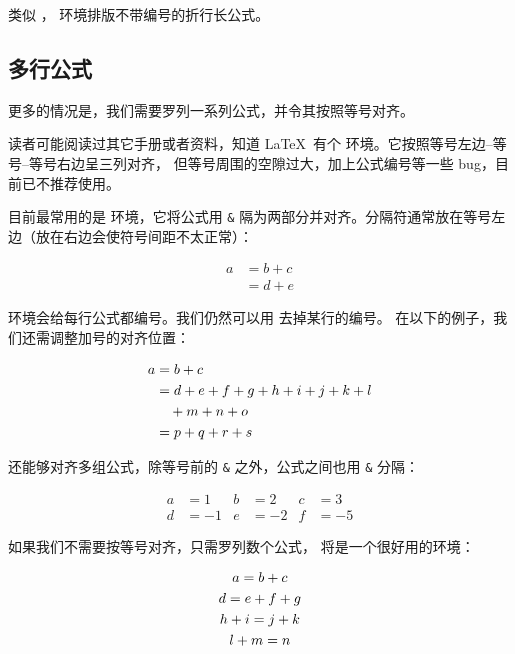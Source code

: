 类似 ， 环境排版不带编号的折行长公式。

\subsection{多行公式}

更多的情况是，我们需要罗列一系列公式，并令其按照等号对齐。

读者可能阅读过其它手册或者资料，知道 \LaTeX\ 有个  环境。它按照等号左边--等号--等号右边呈三列对齐，
但等号周围的空隙过大，加上公式编号等一些 bug，目前已不推荐使用。

目前最常用的是  环境，它将公式用 \texttt\& 隔为两部分并对齐。分隔符通常放在等号左边（放在右边会使符号间距不太正常）：
\begin{example}
\begin{align}
a & = b + c \\
& = d + e
\end{align}
\end{example}

 环境会给每行公式都编号。我们仍然可以用  去掉某行的编号。
在以下的例子，我们还需调整加号的对齐位置：
\begin{example}
\begin{align}
a & = b + c \\
  & = d + e + f + g + h + i
  + j + k + l \notag \\
  &\quad + m + n + o \\
  & = p + q + r + s
\end{align}
\end{example}

 还能够对齐多组公式，除等号前的 \texttt\& 之外，公式之间也用 \texttt\& 分隔：
\begin{example}
\begin{align}
a &=1 & b &=2 & c &=3 \\
d &=-1 & e &=-2 & f &=-5 
\end{align}
\end{example}

如果我们不需要按等号对齐，只需罗列数个公式， 将是一个很好用的环境：
\begin{example}
\begin{gather}
a = b + c \\
d = e + f + g \\
h + i = j + k \notag \\
l + m = n
\end{gather}
\end{example}

